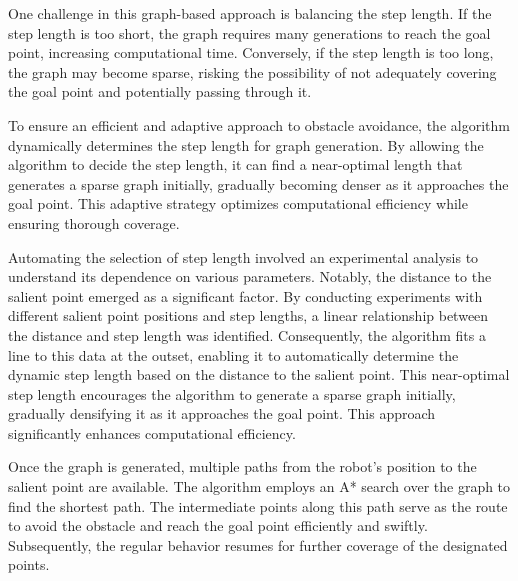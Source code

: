 \vspace*{6mm}  

One challenge in this graph-based approach is balancing the step length. If the step length is too short, the graph requires many generations to reach the goal point, increasing computational time. Conversely, if the step length is too long, the graph may become sparse, risking the possibility of not adequately covering the goal point and potentially passing through it.


\vspace*{6mm}  





To ensure an efficient and adaptive approach to obstacle avoidance, the algorithm dynamically determines the step length for graph generation. By allowing the algorithm to decide the step length, it can find a near-optimal length that generates a sparse graph initially, gradually becoming denser as it approaches the goal point. This adaptive strategy optimizes computational efficiency while ensuring thorough coverage.

\vspace*{6mm}  

Automating the selection of step length involved an experimental analysis to understand its dependence on various parameters. Notably, the distance to the salient point emerged as a significant factor. By conducting experiments with different salient point positions and step lengths, a linear relationship between the distance and step length was identified. Consequently, the algorithm fits a line to this data at the outset, enabling it to automatically determine the dynamic step length based on the distance to the salient point. This near-optimal step length encourages the algorithm to generate a sparse graph initially, gradually densifying it as it approaches the goal point. This approach significantly enhances computational efficiency.

\vspace*{6mm}  

Once the graph is generated, multiple paths from the robot's position to the salient point are available. The algorithm employs an A* search over the graph to find the shortest path. The intermediate points along this path serve as the route to avoid the obstacle and reach the goal point efficiently and swiftly. Subsequently, the regular behavior resumes for further coverage of the designated points.

\vspace*{6mm}  

